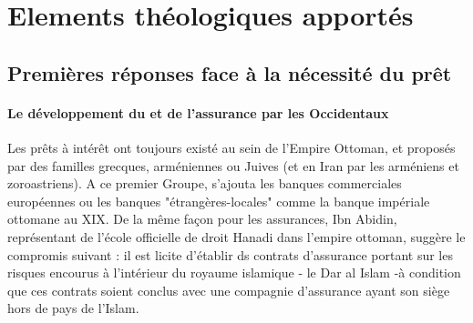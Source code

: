 \section{Elements théologiques apportés}

\subsection{Premières réponses face à la nécessité du prêt}
\paragraph{Le développement du \riba et de l'assurance par les Occidentaux} Les prêts à intérêt ont toujours existé au sein de l'Empire Ottoman\cite{Gilbar:Qadi}, et proposés par des familles grecques, arméniennes ou Juives (et en Iran par les arméniens et zoroastriens). A ce premier Groupe, s'ajouta les banques commerciales européennes ou les banques "étrangères-locales" comme la banque impériale ottomane au XIX.
De la même façon pour les assurances, Ibn Abidin, représentant de l'école officielle de droit Hanadi dans l'empire ottoman, suggère le compromis suivant : il est licite d'établir ds contrats d'assurance portant sur les risques encourus à l'intérieur du royaume islamique - le Dar al Islam -à condition que ces contrats soient conclus avec une compagnie d'assurance ayant son siège hors de pays de l'Islam. 

